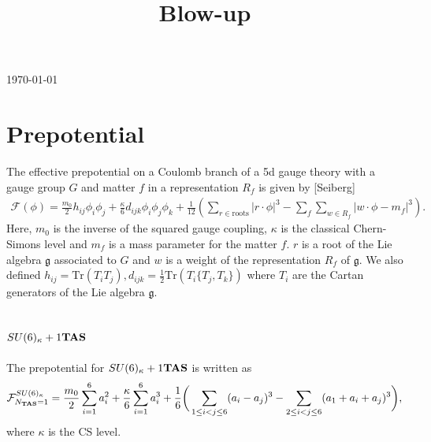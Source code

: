 \documentclass[11pt,a4paper]{article}
\title{Blow-up}
\begin{document}
\preprint{
\begin{flushright}
\tt 
\end{flushright}
}
\today
\section{Prepotential}
The effective prepotential on a Coulomb branch of a 5d gauge theory with a gauge group $G$ and matter $f$ in a representation $R_f$ is given by [Seiberg] %
\begin{align}
\mathcal{F}(\phi) = \frac{m_0}{2}h_{ij}\phi_i\phi_j + \frac{\kappa}{6}d_{ijk}\phi_i\phi_j\phi_k + \frac{1}{12}\left(\sum_{r\in\text{roots}}\left|r\cdot \phi\right|^3 - \sum_f\sum_{w \in R_f}\left|w\cdot \phi - m_f\right|^3\right). \label{prepotential}
\end{align}
Here, $m_0$ is the inverse of the squared gauge coupling, $\kappa$ is the classical Chern-Simons level and $m_f$ is a mass parameter for the matter $f$. $r$ is a root of the Lie algebra $\mathfrak{g}$ associated to $G$ and $w$ is a weight of the representation $R_f$ of $\mathfrak{g}$. We also defined $h_{ij} = \text{Tr}(T_iT_j), d_{ijk} = \frac{1}{2}\text{Tr}\left(T_i\{T_j, T_k\}\right)$ where $T_i$ are the Cartan generators of the Lie algebra $\mathfrak{g}$.
\subsection{$SU(6)_\kappa+1{\bf TAS}$}
The prepotential for $SU(6)_\kappa+1{\bf TAS}$ is written as 
\begin{align}
\mathcal{F}^{SU(6)_{\kappa}}_{N_{{\bf TAS}}=1} = \frac{m_0}{2}\sum_{i=1}^6a_i^2 + \frac{\kappa}{6}\sum_{i=1}^6a_i^3 +\frac{1}{6}\bigg(\sum_{1 \leq i < j \leq 6}(a_i - a_j)^3 - \sum_{2 \leq i < j \leq 6}(a_1 + a_i + a_j)^3\bigg), \label{eq:preSU6TSA}
\end{align}
where $\kappa$ is the CS level. 
\end{document}
